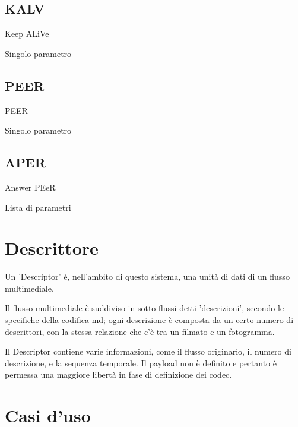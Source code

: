 \subsection{KALV}
%

Keep ALiVe



Singolo parametro






\subsection{PEER}
%

PEER



Singolo parametro






\subsection{APER}
%

Answer PEeR



Lista di parametri






\section{Descrittore}


Un 'Descriptor' è, nell'ambito di questo sistema, una unità di dati di un flusso multimediale.



Il flusso multimediale è suddiviso in sotto-flussi detti 'descrizioni', secondo le specifiche della codifica md; ogni descrizione è composta da un certo numero di descrittori, con la stessa relazione che c'è tra un filmato e un fotogramma.



Il Descriptor contiene varie informazioni, come il flusso originario, il numero di descrizione, e la sequenza temporale. Il payload non è definito e pertanto è permessa una maggiore libertà in fase di definizione dei codec.






\section{Casi d'uso}


